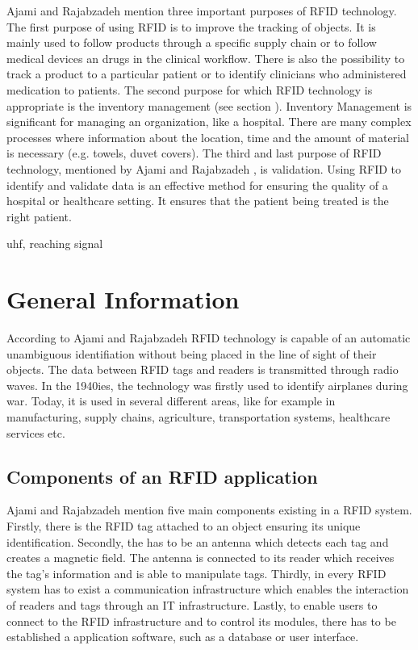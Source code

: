 Ajami and Rajabzadeh \cite{ncbi} mention three important purposes of RFID technology. The first purpose of using RFID is to improve the tracking of objects. It is mainly used to follow products through a specific supply chain or to follow medical devices an drugs in the clinical workflow. There is also the possibility to track a product to a particular patient or to identify clinicians who administered medication to patients.
The second purpose for which RFID technology is appropriate is the inventory management (see section \pageref{inventory}). Inventory Management is significant for managing an organization, like a hospital. There are many complex processes where information about the location, time and the amount of material is necessary (e.g. towels, duvet covers).
The third and last purpose of RFID technology, mentioned by Ajami and Rajabzadeh \cite{ncbi}, is validation. Using RFID to identify and validate data is an effective method for ensuring the quality of a hospital or healthcare setting. It ensures that the patient being treated is the right patient.

uhf, reaching signal

\section{General Information}

According to Ajami and Rajabzadeh \cite{ncbi} RFID technology is capable of an automatic unambiguous identifiation without being placed in the line of sight of their objects. The data between RFID tags and readers is transmitted through radio waves. In the 1940ies, the technology was firstly used to identify airplanes during war. Today, it is used in several different areas, like for example in manufacturing, supply chains, agriculture, transportation systems, healthcare services etc. 

\subsection{Components of an RFID application}

Ajami and Rajabzadeh \cite{ncbi} mention five main components existing in a RFID system. Firstly, there is the RFID tag attached to an object ensuring its unique identification. Secondly, the has to be an antenna which detects each tag and creates a magnetic field. The antenna is connected to its reader which receives the tag's information and is able to manipulate tags. Thirdly, in every RFID system has to exist a communication infrastructure which enables the interaction of readers and tags through an \ac{IT} infrastructure. Lastly, to enable users to connect to the RFID infrastructure and to control its modules, there has to be established a application software, such as a database or user interface.

